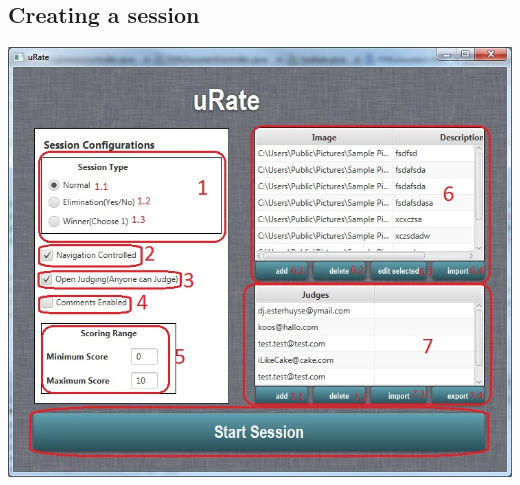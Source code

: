 \documentclass[10pt,a4paper]{article}
\begin{document}
\subsection{Creating a session}
\includegraphics[scale=0.5]{Pictures/serverMain.jpg}
\end{document}
